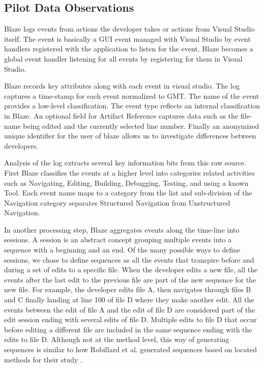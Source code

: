 \documentclass{sig-alternate}
\begin{document}
\subsection{Pilot Data Observations}

Blaze logs events from actions the developer takes or actions from Visual Studio itself.
 The event is basically a GUI event managed with Visual Studio by event handlers registered with the application to listen for the event.  Blaze becomes a global event handler listening for all events by registering for them in Visual Studio.  

Blaze records key attributes along with each event in visual studio.  The log captures a time-stamp for each event normalized to GMT.  The name of the event provides a low-level classification.  The event type reflects an internal classification in Blaze.  An optional field for Artifact Reference captures data such as the file-name being edited and the currently selected line number.  Finally an anonymized unique identifier for the user of blaze allows us to investigate differences between developers.

Analysis of the log extracts several key information bits from this raw source.  First Blaze classifies the events at a higher level into categories related activities such as Navigating, Editing, Building, Debugging,  Testing, and using a  known Tool.  Each event name maps to a category from the list and sub-division of the Navigation category separates Structured Navigation from Unstructured Navigation.

In another processing step, Blaze aggregates events along the time-line into sessions.  A session is an abstract concept grouping multiple events into a sequence with a beginning and an end.  Of the many possible ways to define sessions, we chose to define sequences as all the events that transpire before and during a set of edits to a specific file.  When the developer edits a new file, all the events after the last edit to the previous file are part of the new sequence for the new file.  For example, the developer edits file A, then navigates through files B and C finally landing at line 100 of file D where they make another edit.  All the events between the edit of file A and the edit of file D are considered part of the edit session ending with several edits of file D.  Multiple edits to file D that occur before editing a different file are included in the same sequence ending with the edits to file D.  Although not at the method level, this way of generating sequences is similar to how Robillard et al. generated sequences based on located methods for their study \cite{wbsnipes:Robillard2004How}.
\end{document}
